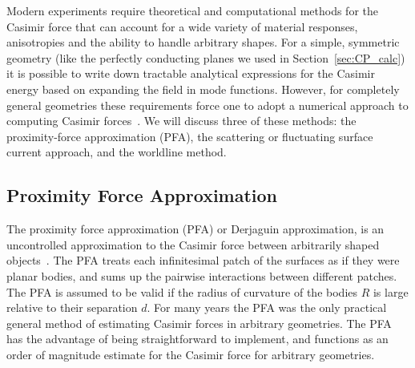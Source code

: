 Modern experiments require theoretical and computational methods
for the Casimir force that can account for a wide variety of material responses, anisotropies
and the ability to handle arbitrary shapes.  
For a simple, symmetric geometry (like the perfectly conducting planes we used in Section~\ref{sec:CP_calc})
it is possible to write down tractable analytical expressions for
the Casimir energy based on expanding the field in mode functions.
However, for completely general geometries these requirements force one to adopt a  
numerical approach to computing Casimir forces~\citep{Johnson2011}.
We will discuss three of these methods: the proximity-force approximation (PFA), the scattering
or fluctuating surface current approach, and the worldline method.

\subsection{Proximity Force Approximation}
\label{sec:PFA}
The proximity force approximation (PFA) or Derjaguin approximation, is an uncontrolled approximation to
the Casimir force between arbitrarily shaped objects~\citep{Derjaguin1934, Blocki1977}.  
The PFA treats each infinitesimal patch of the surfaces as if they were planar bodies,
and sums up the pairwise interactions between different patches.
The PFA is assumed to be valid if the radius of curvature of the bodies $R$ is large relative to 
their separation $d$.  
For many years the PFA was the only practical general method of estimating Casimir forces in arbitrary geometries.
The PFA has the advantage of being straightforward to implement, and functions as an order of magnitude
estimate for the Casimir force for arbitrary geometries.

